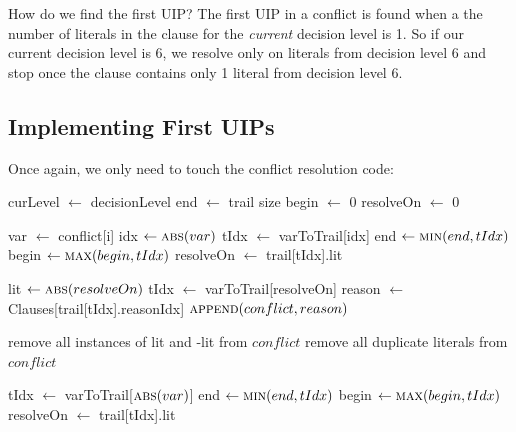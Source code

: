 How do we find the first UIP? The first UIP in a conflict is found when a the number 
of literals in the clause for the \textit{current} decision level is 1. So if our current 
decision level is 6, we resolve only on literals from decision level 6 and stop once the 
clause contains only 1 literal from decision level 6.

\subsection{Implementing First UIPs}

Once again, we only need to touch the conflict resolution code:

\begin{algorithm}[H]
\caption{Naive First UIP Conflict Resolution}\label{alg:33}
\begin{algorithmic}[1]

\State curLevel $\gets$ decisionLevel
\State end $\gets$ trail size
\State begin $\gets$ 0
\State resolveOn $\gets$ 0

    \State var $\gets$ conflict[i]
    \State idx $\gets \Call{abs}{var}$
    \State tIdx $\gets$ varToTrail[idx]
        \State end $\gets \Call{min}{end, tIdx}$
        \State begin $\gets \Call{max}{begin, tIdx}$
            \State resolveOn $\gets$ trail[tIdx].lit
        \EndIf
    \EndIf
\EndFor

    \State lit $\gets \Call{abs}{resolveOn}$
    \State tIdx $\gets$ varToTrail[resolveOn]
    \State reason $\gets$ Clauses[trail[tIdx].reasonIdx]
    \State $\Call{append}{conflict, reason}$

    \State remove all instances of lit and -lit from $conflict$
    \State remove all duplicate literals from $conflict$

        \State tIdx $\gets$ varToTrail[$\Call{abs}{var}$]
            \State end $\gets \Call{min}{end, tIdx}$
            \State begin $\gets \Call{max}{begin, tIdx}$
                \State resolveOn $\gets$ trail[tIdx].lit
            \EndIf
        \EndIf
    \EndFor
\EndWhile

\EndProcedure
\end{algorithmic}
\end{algorithm}

